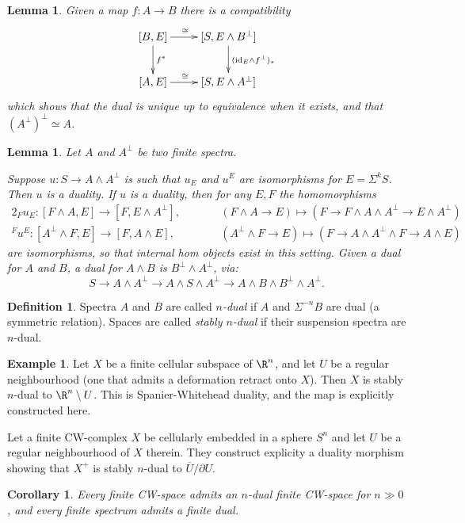 \documentclass[11pt]{article}
\theoremstyle{plain}
\newtheorem{lem}[thm]{Lemma}
\newtheorem{cor}[thm]{Corollary}
\theoremstyle{definition}
\newtheorem{defn}[thm]{Definition}
\newtheorem{exmp}[thm]{Example}
\begin{document}
\begin{lem}
Given a map $f:A\to B$ there is a compatibility
\[\xymatrix{
\ar[d]^{f^*}[B,E]\ar[r]^{\cong\ \ \ }&
[S,E\wedge B^\perp]\ar[d]^{(\id_E\wedge f^\perp)_*}\\
[A,E]\ar[r]^{\cong\ \ \ }&[S,E\wedge A^\perp]
}\]
which shows that the dual is unique up to equivalence when it exists, and that
$(A^\perp)^\perp\simeq A$.
\end{lem}
\begin{lem}
Let $A$ and $A^\perp$ be two finite spectra.
\begin{itemise}
\itm[(i)]Suppose $u:S\to A\wedge A^\perp$ is such that $u_E$ and $u^E$ are
isomorphisms for $E=\Sigma^k S$. Then $u$ is a duality.
\itm[(ii)]If $u$ is a duality, then for any $E,F$ the homomorphisms
\begin{alignat*}{2}
_Fu_E:[F\wedge A,E]\to[F,E\wedge A^\perp],&\qquad &
(F\wedge A\to E)\mapsto (F\to F\wedge A\wedge A^\perp\to E\wedge A^\perp)\\
^Fu^E:[A^\perp\wedge F,E]\to[F,A\wedge E],&\qquad &
(A^\perp\wedge F\to E)\mapsto (F\to A\wedge A^\perp\wedge F\to A\wedge E)
\end{alignat*}
are isomorphisms, so that internal hom objects exist in this setting.
\itm[(iii)]Given a dual for $A$ and $B$, a dual for $A\wedge B$ is
$B^\perp\!\wedge A^\perp$, via:
\[S\to A\wedge A^\perp\to A\wedge S\wedge A^\perp\to 
A\wedge B\wedge B^\perp\!\wedge A^\perp.\]
\end{itemise}
\end{lem}
\setcounter{thm}{6}
\begin{defn}
Spectra $A$ and $B$ are called \emph{$n$-dual} if $A$ and $\Sigma^{-n}B$ are
dual (a symmetric relation). Spaces are called \emph{stably $n$-dual} if their
suspension spectra are $n$-dual.
\end{defn}
\begin{exmp}
Let $X$ be a finite cellular subspace of $\R^n$, and let $U$ be a regular
neighbourhood (one that admits a deformation retract onto $X$). Then $X$ is
stably $n$-dual to $\R^n\setminus U$. This is Spanier-Whitehead duality, and the
map is explicitly constructed here.

Let a finite CW-complex $X$ be cellularly embedded in a sphere $S^n$ and let $U$
be a regular neighbourhood of $X$ therein. They construct explicity a duality
morphism showing that $X^+$ is stably $n$-dual to $\overline U/\partial U$.
\end{exmp}
\begin{cor}
Every finite CW-space admits an $n$-dual finite CW-space for $n\gg0$, and every
finite spectrum admits a finite dual.
\end{cor}
\end{document}
